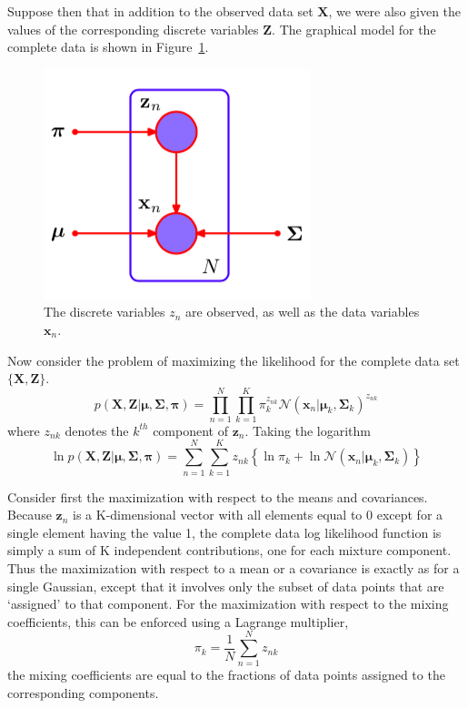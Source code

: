 \documentclass[5p,sort&compress]{elsarticle}
\begin{document}
Suppose then that in addition to the observed data set $\mathbf{X}$, we were also given the values of the corresponding discrete variables $\mathbf{Z}$. The graphical model for the complete data is shown in Figure~\ref{fig:9_9}.

\begin{figure}[ht]
     \centering
     \includegraphics[width = 0.8\linewidth]{figure/figure9_9.png}
     \caption{The discrete variables $z_n$ are observed, as well as the data variables $\mathbf{x}_n$.}
     \label{fig:9_9}
\end{figure}

Now consider the problem of maximizing the likelihood for the complete data set $\{\mathbf{X}, \mathbf{Z}\}$.
\begin{equation}
p(\mathbf{X}, \mathbf{Z} | \boldsymbol{\mu}, \boldsymbol{\Sigma}, \boldsymbol{\pi})=\prod_{n=1}^{N} \prod_{k=1}^{K} \pi_{k}^{z_{n k}} \mathcal{N}\left(\mathbf{x}_{n} | \boldsymbol{\mu}_{k}, \boldsymbol{\Sigma}_{k}\right)^{z_{n k}}
\end{equation}
where $z_{nk}$ denotes the $k^{th}$ component of $\mathbf{z}_n$. Taking the logarithm
\begin{equation}
\ln p(\mathbf{X}, \mathbf{Z} | \boldsymbol{\mu}, \boldsymbol{\Sigma}, \boldsymbol{\pi})=\sum_{n=1}^{N} \sum_{k=1}^{K} z_{n k}\left\{\ln \pi_{k}+\ln \mathcal{N}\left(\mathbf{x}_{n} | \boldsymbol{\mu}_{k}, \boldsymbol{\Sigma}_{k}\right)\right\}
\end{equation}

Consider first the maximization with respect to the means and covariances. Because $\mathbf{z}_n$ is a K-dimensional vector with all elements equal to 0 except for a single element having the value 1, the complete data log likelihood function is simply a sum of K independent contributions, one for each mixture component. Thus the maximization with respect to a mean or a covariance is exactly as for a single Gaussian, except that it involves only the subset of data points that are `assigned' to that component. For the maximization with respect to the mixing coefficients, this can be enforced using a Lagrange multiplier,
\begin{equation}
\pi_{k}=\frac{1}{N} \sum_{n=1}^{N} z_{n k}
\end{equation}
the mixing coefficients are equal to the fractions of data points assigned to the corresponding components.
\end{document}
